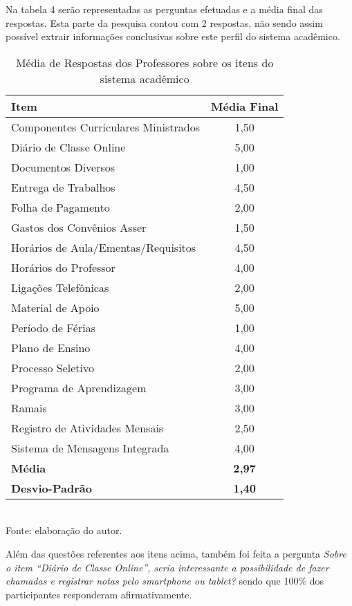 Na tabela 4 serão representadas as perguntas efetuadas e a média final das respostas. Esta parte da pesquisa contou com 2 respostas, não sendo assim possível extrair informações conclusivas sobre este perfil do sistema acadêmico.

\begin{table}[!hbt]
\centering
\caption[Média de Respostas dos Professores]{Média de Respostas dos Professores sobre os itens do sistema acadêmico}
\vspace{3mm}
\begin{tabular}{p{9.5cm}|c}\hline
\textbf{Item} & \textbf{Média Final} \\ \hline
Componentes Curriculares Ministrados & 1,50 \\ \hline
Diário de Classe Online & 5,00 \\ \hline
Documentos Diversos & 1,00 \\ \hline
Entrega de Trabalhos & 4,50 \\ \hline
Folha de Pagamento & 2,00 \\ \hline
Gastos dos Convênios Asser & 1,50 \\ \hline
Horários de Aula/Ementas/Requisitos & 4,50 \\ \hline
Horários do Professor & 4,00 \\ \hline
Ligações Telefônicas & 2,00 \\ \hline
Material de Apoio & 5,00 \\ \hline
Período de Férias & 1,00 \\ \hline
Plano de Ensino & 4,00 \\ \hline
Processo Seletivo & 2,00 \\ \hline
Programa de Aprendizagem & 3,00 \\ \hline
Ramais & 3,00 \\ \hline
Registro de Atividades Mensais & 2,50 \\ \hline
Sistema de Mensagens Integrada & 4,00 \\ \hline
\textbf{Média} & \textbf{2,97} \\ \hline
\textbf{Desvio-Padrão} & \textbf{1,40} \\ \hline
\end{tabular}
\\ Fonte: elaboração do autor.
\end{table}

\newpage

Além das questões referentes aos itens acima, também foi feita a pergunta \emph{Sobre o item “Diário de Classe Online'', seria interessante a possibilidade de fazer chamadas e registrar notas pelo smartphone ou tablet?} sendo que 100\% dos participantes responderam afirmativamente.

